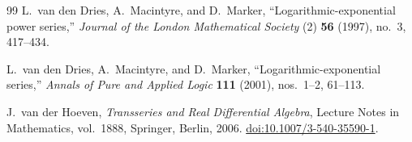 \documentclass[11pt,oneside]{article}
\theoremstyle{plain}
\theoremstyle{definition}
\theoremstyle{remark}
\begin{document}
\begin{thebibliography}{99}
L.~van den Dries, A.~Macintyre, and D.~Marker,
``Logarithmic-exponential power series,''
\emph{Journal of the London Mathematical Society} (2) \textbf{56} (1997),
no.~3, 417--434.

L.~van den Dries, A.~Macintyre, and D.~Marker,
``Logarithmic-exponential series,''
\emph{Annals of Pure and Applied Logic} \textbf{111} (2001), nos.~1--2,
61--113.

J.~van der Hoeven,
\emph{Transseries and Real Differential Algebra},
Lecture Notes in Mathematics, vol.~1888, Springer, Berlin, 2006.
\href{https://doi.org/10.1007/3-540-35590-1}{doi:10.1007/3-540-35590-1}.

\end{thebibliography}
\end{document}
